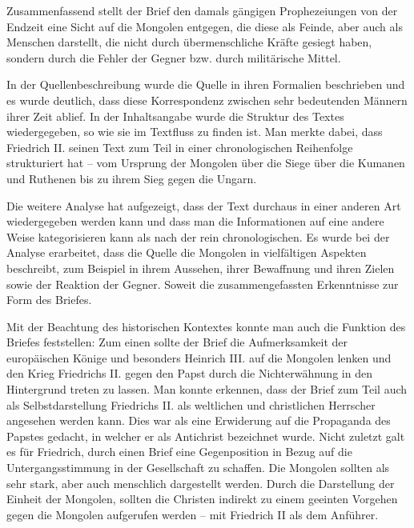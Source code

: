 \documentclass{../../sem_paper}
\begin{document}
Zusammenfassend stellt der Brief den damals gängigen Prophezeiungen von der
Endzeit eine Sicht auf die Mongolen entgegen, die diese als Feinde, aber auch als
Menschen darstellt, die nicht durch übermenschliche Kräfte gesiegt haben, sondern
durch die Fehler der Gegner bzw. durch militärische Mittel.
\newpage
{}

In der
Quellenbeschreibung wurde die Quelle in ihren Formalien beschrieben und es wurde
deutlich, dass diese Korrespondenz zwischen sehr bedeutenden Männern ihrer Zeit
ablief. In der Inhaltsangabe wurde die Struktur des Textes wiedergegeben, so wie sie im
Textfluss zu finden ist. Man merkte dabei, dass Friedrich II. seinen Text zum Teil in
einer chronologischen Reihenfolge strukturiert hat – vom Ursprung der Mongolen über
die Siege über die Kumanen und Ruthenen bis zu ihrem Sieg gegen die Ungarn.

Die weitere Analyse hat aufgezeigt, dass der Text durchaus in einer anderen Art
wiedergegeben werden kann und dass man die Informationen auf eine andere Weise
kategorisieren kann als nach der rein chronologischen. Es wurde bei der Analyse erarbeitet,
dass die Quelle die Mongolen in vielfältigen Aspekten beschreibt, zum Beispiel in
ihrem Aussehen, ihrer Bewaffnung und ihren Zielen sowie der Reaktion der Gegner.
Soweit die zusammengefassten Erkenntnisse zur Form des Briefes.

Mit der Beachtung des historischen Kontextes konnte man auch die Funktion des
Briefes feststellen: Zum einen sollte der Brief die Aufmerksamkeit der europäischen
Könige und besonders Heinrich III. auf die Mongolen lenken und den Krieg Friedrichs
II. gegen den Papst durch die Nichterwähnung in den Hintergrund treten zu lassen. Man
konnte erkennen, dass der Brief zum Teil auch als Selbstdarstellung Friedrichs II. als
weltlichen und christlichen Herrscher angesehen werden kann. Dies war als eine Erwiderung auf die
Propaganda des Papstes gedacht, in welcher er als Antichrist bezeichnet wurde. Nicht
zuletzt galt es für Friedrich, durch einen Brief eine Gegenposition in Bezug auf die
Untergangsstimmung in der Gesellschaft zu schaffen. Die Mongolen sollten als sehr
stark, aber auch menschlich dargestellt werden. Durch die Darstellung der Einheit der
Mongolen, sollten die Christen indirekt zu einem geeinten Vorgehen gegen die
Mongolen aufgerufen werden – mit Friedrich II als dem Anführer.

\literature
\end{document}
